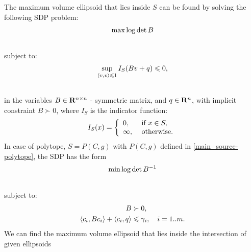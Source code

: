 \documentclass[letterpaper,10pt,english]{sphinxmanual}
\begin{document}
The maximum volume ellipsoid that lies inside $S$ can be found by
solving the following SDP problem:
\begin{gather}
\begin{split}\max \log \det B\end{split}\notag\\\begin{split}\end{split}\notag
\end{gather}
subject to:
\begin{gather}
\begin{split}\sup_{\langle v,v\rangle\leqslant1} I_S(Bv+q)\leqslant0 ,\end{split}\notag\\\begin{split}\end{split}\notag
\end{gather}
in the variables $B\in{\bf R}^{n\times n}$ - symmetric matrix,
and $q\in{\bf R}^n$, with implicit constraint $B\succ 0$,
where $I_S$ is the indicator function:
\begin{gather}
\begin{split}I_S(x) = \left\{\begin{array}{ll}
0, & \mbox{ if } x\in S,\\
\infty, & \mbox{ otherwise.}\end{array}\right.\end{split}\notag
\end{gather}
In case of polytope, $S=P(C,g)$ with $P(C,g)$ defined in
\eqref{main_source-polytope}, the SDP has the form
\begin{gather}
\begin{split}\min \log \det B^{-1}\end{split}\notag\\\begin{split}\end{split}\notag
\end{gather}
subject to:
\begin{gather}
\begin{split}\begin{aligned}
B & \succ 0,\\
\langle c_i, Bc_i\rangle + \langle c_i, q\rangle & \leqslant \gamma_i,
~~~ i=1..m.\end{aligned}\end{split}\notag
\end{gather}
We can find the maximum volume ellipsoid that lies inside the
intersection of given ellipsoids
\end{document}
